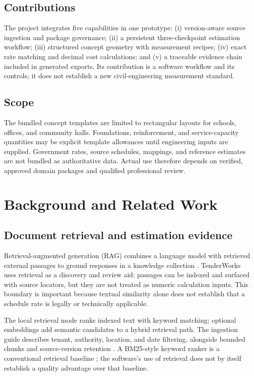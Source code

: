 \subsection{Contributions}
The project integrates five capabilities in one prototype: (i) version-aware source ingestion and package governance; (ii) a persistent three-checkpoint estimation workflow; (iii) structured concept geometry with measurement recipes; (iv) exact rate matching and decimal cost calculations; and (v) a traceable evidence chain included in generated exports. Its contribution is a software workflow and its controls; it does not establish a new civil-engineering measurement standard.

\subsection{Scope}
The bundled concept templates are limited to rectangular layouts for schools, offices, and community halls. Foundations, reinforcement, and service-capacity quantities may be explicit template allowances until engineering inputs are supplied. Government rates, source schedules, mappings, and reference estimates are not bundled as authoritative data. Actual use therefore depends on verified, approved domain packages and qualified professional review.

\section{Background and Related Work}
\subsection{Document retrieval and estimation evidence}
Retrieval-augmented generation (RAG) combines a language model with retrieved external passages to ground responses in a knowledge collection \cite{lewis2020rag}. TenderWorks uses retrieval as a discovery and review aid: passages can be indexed and surfaced with source locators, but they are not treated as numeric calculation inputs. This boundary is important because textual similarity alone does not establish that a schedule rate is legally or technically applicable.

The local retrieval mode ranks indexed text with keyword matching; optional embeddings add semantic candidates to a hybrid retrieval path. The ingestion guide describes tenant, authority, location, and date filtering, alongside bounded chunks and source-version retention \cite{tenderworks2026}. A BM25-style keyword ranker is a conventional retrieval baseline \cite{robertson2009bm25}; the software's use of retrieval does not by itself establish a quality advantage over that baseline.

